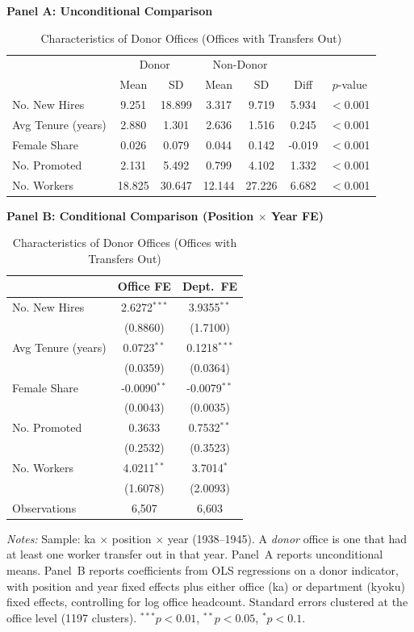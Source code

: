 \begin{table}[htbp]
\centering
\caption{Characteristics of Donor Offices (Offices with Transfers Out)}
\label{tab:donor}
\small
\begin{threeparttable}

\textbf{Panel A: Unconditional Comparison}
\medskip

\begin{tabular}{lcccccc}
\toprule
 & \multicolumn{2}{c}{Donor} & \multicolumn{2}{c}{Non-Donor} & & \\
 & Mean & SD & Mean & SD & Diff & $p$-value \\
\midrule
No. New Hires & 9.251 & 18.899 & 3.317 & 9.719 & 5.934 & $<$0.001 \\
Avg Tenure (years) & 2.880 & 1.301 & 2.636 & 1.516 & 0.245 & $<$0.001 \\
Female Share & 0.026 & 0.079 & 0.044 & 0.142 & -0.019 & $<$0.001 \\
No. Promoted & 2.131 & 5.492 & 0.799 & 4.102 & 1.332 & $<$0.001 \\
No. Workers & 18.825 & 30.647 & 12.144 & 27.226 & 6.682 & $<$0.001 \\
\bottomrule
\end{tabular}

\bigskip

\textbf{Panel B: Conditional Comparison (Position $\times$ Year FE)}
\medskip

\begin{tabular}{lcc}
\toprule
 & Office FE & Dept.\ FE \\
\midrule
No. New Hires & 2.6272$^{***}$ & 3.9355$^{**}$ \\
 & (0.8860) & (1.7100) \\
Avg Tenure (years) & 0.0723$^{**}$ & 0.1218$^{***}$ \\
 & (0.0359) & (0.0364) \\
Female Share & -0.0090$^{**}$ & -0.0079$^{**}$ \\
 & (0.0043) & (0.0035) \\
No. Promoted & 0.3633 & 0.7532$^{**}$ \\
 & (0.2532) & (0.3523) \\
No. Workers & 4.0211$^{**}$ & 3.7014$^{*}$ \\
 & (1.6078) & (2.0093) \\
\midrule
Observations & 6,507 & 6,603 \\
\bottomrule
\end{tabular}

\begin{tablenotes}[flushleft]
\footnotesize
\item \textit{Notes:} Sample: ka $\times$ position $\times$ year (1938--1945). A \emph{donor} office is one that had at least one worker transfer out in that year. Panel~A reports unconditional means. Panel~B reports coefficients from OLS regressions on a donor indicator, with position and year fixed effects plus either office (ka) or department (kyoku) fixed effects, controlling for log office headcount. Standard errors clustered at the office level (1197 clusters). $^{***}p<0.01$, $^{**}p<0.05$, $^{*}p<0.1$.
\end{tablenotes}
\end{threeparttable}
\end{table}
